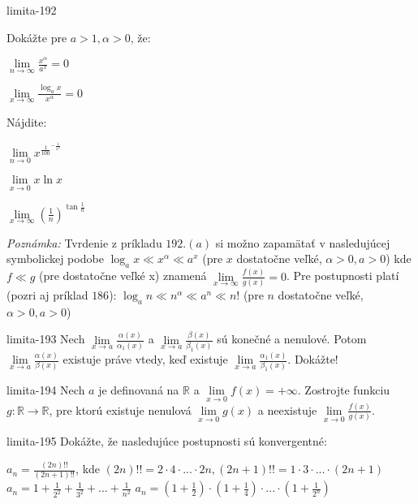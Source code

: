\begin{defproblem}{limita-192}
\begin{tasks}
\task Dokážte pre $a > 1,\alpha > 0$, že:
    \begin{enumerate*}
        \item $\lim\limits_{n \rightarrow \infty} \frac{x^{\alpha}}{a^x}=0$
        \item $\lim\limits_{x \rightarrow \infty} \frac{\log_a x}{x^\alpha}=0$
    \end{enumerate*}
\task Nájdite:
    \begin{enumerate*}
        \item $\lim\limits_{n \rightarrow 0} x^{\frac{1}{100}^{-\frac{1}{x^2}}}$
        \item $\lim\limits_{x \rightarrow 0} x \ln x$
        \item $\lim\limits_{x \rightarrow \infty} (\frac{1}{n})^{\tan \frac{1}{n}}$
    \end{enumerate*}
\end{tasks}
\textit{Poznámka:}
Tvrdenie z príkladu $192.(a)$ si možno zapamätať v nasledujúcej symbolickej
podobe $\log_a x\ll x^\alpha \ll a^x$ (pre $x$ dostatočne veľké, $\alpha >0,
a>0$) kde $f\ll g$ (pre dostatočne veľké x) znamená $\lim\limits_{x \rightarrow
\infty} \frac{f(x)}{g(x)}=0$. Pre postupnosti platí (pozri aj príklad $186$):
$\log_a n\ll n^\alpha\ll a^n\ll n!$ (pre $n$ dostatočne veľké,  $\alpha >0,
a>0$)
\end{defproblem}

\begin{defproblem}{limita-193}
Nech $\lim\limits_{x \rightarrow a} \frac{\alpha (x)}{\alpha_1 (x)}$ a
$\lim\limits_{x \rightarrow a} \frac{\beta (x)}{\beta_1(x)}$ sú konečné a
nenulové. Potom $\lim\limits_{x \rightarrow a} \frac{\alpha (x)}{\beta (x)}$
existuje práve vtedy, keď existuje $\lim\limits_{x \rightarrow a} \frac{\alpha_1
(x)}{\beta_1 (x)}$. Dokážte!
\end{defproblem}

\begin{defproblem}{limita-194}
Nech $a$ je definovaná na $\mathbb{R}$ a $\lim\limits_{x \rightarrow 0}
f(x)=+\infty$. Zostrojte funkciu $g: \mathbb{R} \rightarrow \mathbb{R}$, pre
ktorú existuje nenulová $\lim\limits_{x \rightarrow 0} g(x)$ a neexistuje
$\lim\limits_{x \rightarrow 0} \frac{f(x)}{g(x)}$.
\end{defproblem}

\begin{defproblem}{limita-195}
Dokážte, že nasledujúce postupnosti sú konvergentné:
\begin{tasks}
\task $a_n=\frac{(2n)!!}{(2n+1)!!}$, kde $(2n)!!=2\cdot4\cdot...\cdot2n,(2n+1)!!=1\cdot3\cdot...\cdot(2n+1)$
\task $a_n=1+\frac{1}{2^2}+\frac{1}{3^2}+...+\frac{1}{n^2}$
\task $a_n=(1+\frac{1}{2})\cdot(1+\frac{1}{4})\cdot...\cdot(1+\frac{1}{2^n})$
\end{tasks}
\end{defproblem}


